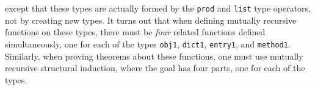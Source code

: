 \documentclass[envcountsame,runningheads]{llncs}
\begin{document}
\noindent
except that these types are actually formed by the
{\tt prod}
and
{\tt list}
type operators, not by creating new types.
It turns out that when defining mutually recursive functions on these
types, there must be {\it four} related functions defined simultaneously,
one for each of the types 
{\tt obj1}, {\tt dict1}, {\tt entry1}, and {\tt method1}.
Similarly, when proving theorems about these functions,
one must use mutually recursive structural induction,
where the goal has four parts, one for each of the types.

%
%
%
%
%
%
%
%
%
%
\end{document}
